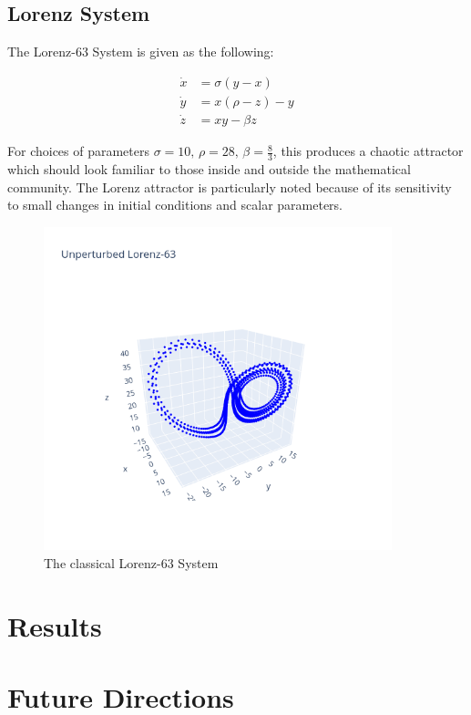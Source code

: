 \documentclass[12pt]{article}
\begin{document}
\subsection{Lorenz System}

The Lorenz-63 System is given as the following:

\begin{align*}
  \dot{x} &= \sigma (y - x)\\
  \dot{y} &= x ( \rho - z ) - y\\
  \dot{z} &= x y - \beta z
\end{align*}

For choices of parameters $\sigma=10,\, \rho=28,\, \beta=\frac{8}{3}$, this produces a chaotic attractor which should look familiar to those inside and outside the mathematical community. The Lorenz attractor is particularly noted because of its sensitivity to small changes in initial conditions and scalar parameters.

\begin{figure}[ht]
  \centering
  \includegraphics[width=0.9\textwidth]{lorenz-unperturbed.png}
  \caption{The classical Lorenz-63 System}
\end{figure}





\section{Results}


\section{Future Directions}



\nocite{*}

\end{document}
